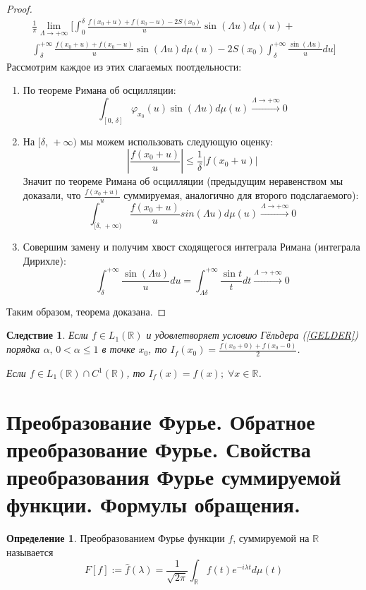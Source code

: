 \documentclass[a4paper,12pt]{article}
\renewcommand{\phi}{\ensuremath{\varphi}}
\renewcommand{\leq}{\ensuremath{\leqslant}}
\theoremstyle{plain}
\newtheorem*{corollary}{Следствие}
\theoremstyle{definition}
\newtheorem{definition}{Определение}[section]
\theoremstyle{remark}
\begin{document}
\begin{proof}
\begin{align*}
		\frac{1}{\pi}\lim_{\Lambda \to +\infty}\Big[\int_0^\delta\frac{f(x_0 + u) + f(x_0 - u) - 2S(x_0)}{u}\sin(\Lambda u)d\mu(u) + \\
			\int_{\delta}^{+\infty} \frac{f(x_0 + u) + f(x_0 - u)}{u}\sin(\Lambda u)d\mu(u) - 2S(x_0)\int_\delta^{+\infty}\frac{\sin(\Lambda u)}{u}du\Big]
	\end{align*}
	Рассмотрим каждое из этих слагаемых поотдельности:
	\begin{enumerate}
		\item По теореме Римана об осцилляции:
		      \[\int_{[0,\,\delta]}\phi_{x_0}(u)\sin(\Lambda u)d\mu(u) \stackrel{\Lambda \to +\infty}{\to} 0\]
		\item На $[\delta,\, +\infty)$ мы можем использовать следующую оценку:
		      \[\left|\frac{f(x_0 + u)}{u}\right| \leq \frac{1}{\delta}|f(x_0 + u)|\]
		      Значит по теореме Римана об осцилляции (предыдущим неравенством мы доказали, что $\frac{f(x_0 + u)}{u}$ суммируемая, аналогично для второго подслагаемого):
		      \[\int_{[\delta,\, +\infty)} \frac{f(x_0 + u)}{u}sin(\Lambda u) d\mu(u) \stackrel{\Lambda \to +\infty}{\to} 0\]
		\item Совершим замену и получим хвост сходящегося интеграла Римана (интеграла Дирихле):
		      \[\int_\delta^{+\infty}\frac{\sin(\Lambda u)}{u}du = \int_{\Lambda\delta}^{+\infty}\frac{\sin t}{t}dt \stackrel{\Lambda \to +\infty}{\to} 0\]
	\end{enumerate}
	Таким образом, теорема доказана.
\end{proof}

\begin{corollary}
	Если $f \in L_1(\mathbb{R})$ и удовлетворяет условию Гёльдера (\ref{GELDER}) порядка $\alpha,\, 0 < \alpha \leq 1$ в точке $x_0$, то $I_f(x_0) = \frac{f(x_0 + 0) + f(x_0 - 0)}{2}$.

	Если $f \in L_1(\mathbb{R}) \cap C^1(\mathbb{R})$, то $I_f(x) = f(x) ;\;\forall x \in \mathbb{R}$.
\end{corollary}

\section{Преобразование Фурье. Обратное преобразование Фурье. Свойства преобразования Фурье суммируемой функции. Формулы обращения.}
\begin{definition}
	Преобразованием Фурье функции $f$, суммируемой на $\mathbb{R}$ называется
	\[F[f] := \hat{f}(\lambda) = \frac{1}{\sqrt{2\pi}}\int_\mathbb{R}f(t)e^{-i\lambda t}d\mu(t)\]
\end{definition}
\end{document}
